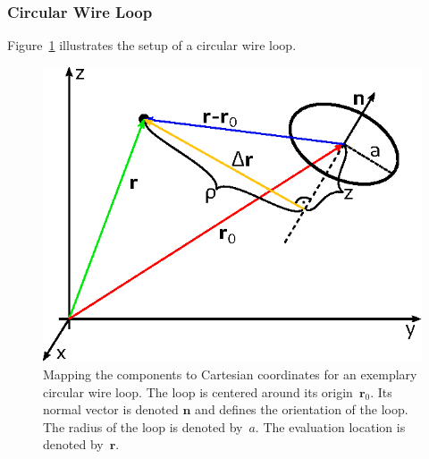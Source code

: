 \subsubsection{Circular Wire Loop}
Figure~\ref{fig:CircularWireLoop_MappingToCartesian} illustrates the setup of a circular wire loop.
\begin{figure}[htbp]
 \centering
 \includegraphics{img/CircularWireLoop_MappingToCartesian.eps}
 \caption{Mapping the components to Cartesian coordinates for an exemplary circular wire loop.
          The loop is centered around its origin~$\mathbf{r}_0$.
          Its normal vector is denoted $\mathbf{n}$ and defines the orientation of the loop.
          The radius of the loop is denoted by~$a$.
          The evaluation location is denoted by~$\mathbf{r}$.}
 \label{fig:CircularWireLoop_MappingToCartesian}
\end{figure}

